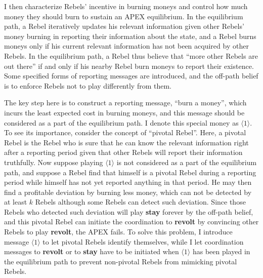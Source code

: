 \documentclass[12pt,letter]{article}
\theoremstyle{definition}
\theoremstyle{remark}
\theoremstyle{claim}
\begin{document}
I then characterize Rebels' incentive in burning moneys and control how much money they should burn to sustain an APEX equilibrium. In the equilibrium path, a Rebel iteratively updates his relevant information given other Rebels' money burning in reporting their information about the state, and a Rebel burns moneys only if his current relevant information has not been acquired by other Rebels. In the equilibrium path, a Rebel thus believe that ``more other Rebels are out there'' if and only if his nearby Rebel burn moneys to report their existence. Some specified forms of reporting messages are introduced, and the off-path belief is to enforce Rebels not to play differently from them.

The key step here is to construct a reporting message, ``burn a money'', which incurs the least expected cost in burning moneys, and this message should be considered as a part of the equilibrium path. I denote this special money as $\langle 1 \rangle$. To see its importance, consider the concept of ``pivotal Rebel''. Here, a pivotal Rebel is the Rebel who is sure that he can know the relevant information right after a reporting period given that other Rebels will report their information truthfully. Now suppose playing $\langle 1 \rangle$ is not considered as a part of the equilibrium path, and suppose a Rebel find that himself is a pivotal Rebel during a reporting period while himself has not yet reported anything in that period. He may then find a profitable deviation by burning less money, which can not be detected by at least $k$ Rebels although some Rebels can detect such deviation. Since those Rebels who detected such deviation will play \textbf{stay} forever by the off-path belief, and this pivotal Rebel can initiate the coordination to \textbf{revolt} by convincing other Rebels to play \textbf{revolt}, the APEX fails. To solve this problem, I introduce message $\langle 1 \rangle$ to let pivotal Rebels identify themselves, while I let coordination messages to \textbf{revolt} or to \textbf{stay} have to be initiated when $\langle 1 \rangle$ has been played in the equilibrium path to prevent non-pivotal Rebels from mimicking pivotal Rebels.
\end{document}
